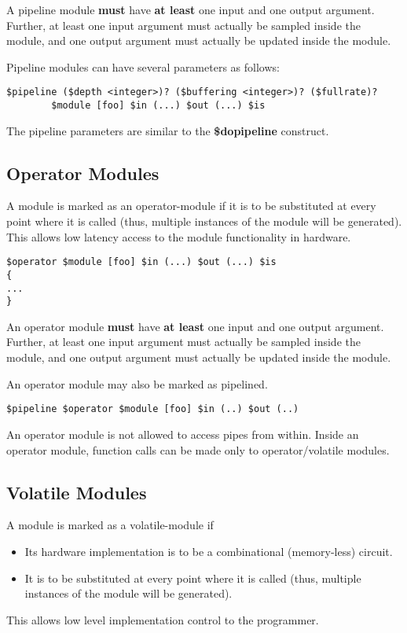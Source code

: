 \documentclass{article}
\begin{document}
A pipeline module {\bf must} have {\bf at least} one input
and one output argument.  Further, at least one input argument
must actually be sampled inside the module, and one output argument
must actually be updated inside the module.

Pipeline modules can have several parameters as follows:
\begin{verbatim}
$pipeline ($depth <integer>)? ($buffering <integer>)? ($fullrate)?
        $module [foo] $in (...) $out (...) $is
\end{verbatim}
The pipeline parameters are similar to the {\bf \$dopipeline} 
construct.


\subsection{Operator Modules}

A module is marked as an operator-module if it
is to be substituted at every point where it
is called (thus, multiple instances of the module
will be generated).
This allows low latency access to the module
functionality in hardware.

\begin{verbatim}
$operator $module [foo] $in (...) $out (...) $is
{
...
}
\end{verbatim}

An operator module {\bf must} have {\bf at least} one input
and one output argument.  Further, at least one input argument
must actually be sampled inside the module, and one output argument
must actually be updated inside the module.

An operator module may also be marked as pipelined.
\begin{verbatim}
$pipeline $operator $module [foo] $in (..) $out (..)
\end{verbatim}

An operator module is not allowed to access pipes from within.
Inside an operator module, function calls can be made only
to operator/volatile modules.

\subsection{Volatile Modules}

A module is marked as a volatile-module if 
\begin{itemize}
\item Its hardware implementation is to be 
a combinational (memory-less) circuit.
\item It is to be substituted at every point where it
is called (thus, multiple instances of the module
will be generated).
\end{itemize}
This allows low level implementation control
to the programmer.
\end{document}

